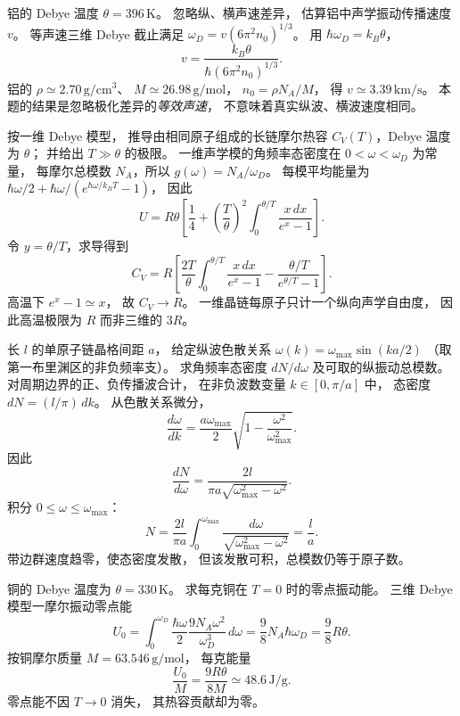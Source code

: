 铝的 Debye 温度 $\theta=396\,\mathrm K$。
忽略纵、横声速差异，
估算铝中声学振动传播速度 $v$。
\exsolution
等声速三维 Debye 截止满足
$\omega_D=v(6\pi^2n_0)^{1/3}$。
用 $\hbar\omega_D=k_B\theta$，
\[
 \boxed{v=\frac{k_B\theta}
 {\hbar(6\pi^2n_0)^{1/3}}}.
\]
铝的 $\rho\simeq2.70\,\mathrm{g/cm^3}$、
$M\simeq26.98\,\mathrm{g/mol}$，
$n_0=\rho N_A/M$，
得 $\boxed{v\simeq3.39\,\mathrm{km/s}}$。
\excheck 本题的结果是忽略极化差异的\emph{等效声速}，
不意味着真实纵波、横波速度相同。

按一维 Debye 模型，
推导由相同原子组成的长链摩尔热容
$C_V(T)$，Debye 温度为 $\theta$；
并给出 $T\gg\theta$ 的极限。
\exsolution
一维声学模的角频率态密度在
$0<\omega<\omega_D$ 为常量，
每摩尔总模数 $N_A$，所以
$g(\omega)=N_A/\omega_D$。
每模平均能量为
$\hbar\omega/2+\hbar\omega/(e^{\hbar\omega/k_BT}-1)$，
因此
\[
 U=R\theta\left[\frac14+
 \left(\frac{T}{\theta}\right)^2
 \int_0^{\theta/T}\frac{x\,dx}{e^x-1}\right].
\]
令 $y=\theta/T$，求导得到
\[
 \boxed{C_V=R\left[
 \frac{2T}{\theta}\int_0^{\theta/T}
 \frac{x\,dx}{e^x-1}
 -\frac{\theta/T}{e^{\theta/T}-1}\right]}.
\]
高温下 $e^x-1\simeq x$，
故 $\boxed{C_V\longrightarrow R}$。
\excheck 一维晶链每原子只计一个纵向声学自由度，
因此高温极限为 $R$ 而非三维的 $3R$。

长 $l$ 的单原子链晶格间距 $a$，
给定纵波色散关系
$\omega(k)=\omega_{\max}\sin(ka/2)$
（取第一布里渊区的非负频率支）。
求角频率态密度 $dN/d\omega$
及可取的纵振动总模数。
\exsolution
对周期边界的正、负传播波合计，
在非负波数变量 $k\in[0,\pi/a]$ 中，
态密度 $dN=(l/\pi)\,dk$。
从色散关系微分，
\[
 \frac{d\omega}{dk}=
 \frac{a\omega_{\max}}2
 \sqrt{1-\frac{\omega^2}{\omega_{\max}^2}}.
\]
因此
\[
 \boxed{\frac{dN}{d\omega}=
 \frac{2l}{\pi a\sqrt{\omega_{\max}^2-\omega^2}}}.
\]
积分 $0\le\omega\le\omega_{\max}$：
\[
 N=\frac{2l}{\pi a}
 \int_0^{\omega_{\max}}
 \frac{d\omega}{\sqrt{\omega_{\max}^2-\omega^2}}
 =\boxed{\frac la}.
\]
\excheck 带边群速度趋零，使态密度发散，
但该发散可积，总模数仍等于原子数。

铜的 Debye 温度为 $\theta=330\,\mathrm K$。
求每克铜在 $T=0$ 时的零点振动能。
\exsolution
三维 Debye 模型一摩尔振动零点能
\[
 U_0=\int_0^{\omega_D}
 \frac{\hbar\omega}2
 \frac{9N_A\omega^2}{\omega_D^3}\,d\omega
 =\frac98N_A\hbar\omega_D
 =\frac98R\theta.
\]
按铜摩尔质量 $M=63.546\,\mathrm{g/mol}$，
每克能量
\[
 \boxed{\frac{U_0}{M}=
 \frac{9R\theta}{8M}
 \simeq48.6\,\mathrm{J/g}}.
\]
\excheck 零点能不因 $T\to0$ 消失，
其热容贡献却为零。

